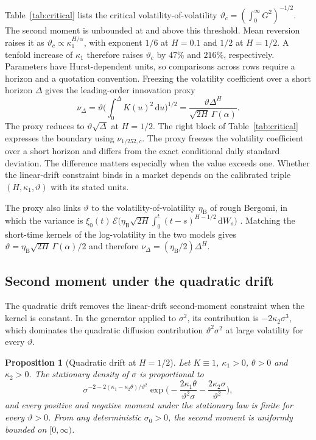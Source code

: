 \documentclass{rQUF2e}
\theoremstyle{plain}
\newtheorem{proposition}[theorem]{Proposition}
\theoremstyle{definition}
\theoremstyle{remark}
\newcommand{\D}{\mathrm{d}}
\begin{document}
Table~\ref{tab:critical} lists the critical volatility-of-volatility $\vartheta_c=(\int_0^\infty G^2)^{-1/2}$. The second moment is unbounded at and above this threshold. Mean reversion raises it as $\vartheta_c\propto\kappa_1^{H/\alpha}$, with exponent $1/6$ at $H=0.1$ and $1/2$ at $H=1/2$. A tenfold increase of $\kappa_1$ therefore raises $\vartheta_c$ by $47\%$ and $216\%$, respectively. Parameters have Hurst-dependent units, so comparisons across rows require a horizon and a quotation convention. Freezing the volatility coefficient over a short horizon $\Delta$ gives the leading-order innovation proxy
\begin{equation*}
\nu_\Delta=\vartheta\Big(\int_0^\Delta K(u)^2\,\D u\Big)^{1/2}
=\frac{\vartheta\Delta^H}{\sqrt{2H}\,\Gamma(\alpha)}.
\end{equation*}
The proxy reduces to $\vartheta\sqrt\Delta$ at $H=1/2$. The right block of Table~\ref{tab:critical} expresses the boundary using $\nu_{1/252,c}$. The proxy freezes the volatility coefficient over a short horizon and differs from the exact conditional daily standard deviation. The difference matters especially when the value exceeds one. Whether the linear-drift constraint binds in a market depends on the calibrated triple $(H,\kappa_1,\vartheta)$ with its stated units.

The proxy also links $\vartheta$ to the volatility-of-volatility $\eta_{\mathrm{B}}$ of rough Bergomi, in which the variance is $\xi_0(t)\,\mathcal{E}\big(\eta_{\mathrm{B}}\sqrt{2H}\int_0^t(t-s)^{H-1/2}\,\D W_s\big)$ \citep{BayerFrizGatheral2016}. Matching the short-time kernels of the log-volatility in the two models gives $\vartheta=\eta_{\mathrm{B}}\sqrt{2H}\,\Gamma(\alpha)/2$ and therefore $\nu_\Delta=(\eta_{\mathrm{B}}/2)\Delta^H$.

\subsection{Second moment under the quadratic drift}\label{sec:classical_qd}

The quadratic drift removes the linear-drift second-moment constraint when the kernel is constant. In the generator applied to $\sigma^2$, its contribution is $-2\kappa_2\sigma^3$, which dominates the quadratic diffusion contribution $\vartheta^2\sigma^2$ at large volatility for every $\vartheta$.

\begin{proposition}[Quadratic drift at $H=1/2$]\label{prop:classical_qd}
Let $K\equiv1$, $\kappa_1>0$, $\theta>0$ and $\kappa_2>0$. The stationary density of $\sigma$ is proportional to
\begin{equation}\label{eq:stationary_density}
\sigma^{-2-2(\kappa_1-\kappa_2\theta)/\vartheta^2}\exp\Big(-\frac{2\kappa_1\theta}{\vartheta^2\sigma}-\frac{2\kappa_2\sigma}{\vartheta^2}\Big),
\end{equation}
and every positive and negative moment under the stationary law is finite for every $\vartheta>0$. From any deterministic $\sigma_0>0$, the second moment is uniformly bounded on $[0,\infty)$.
\end{proposition}
\end{document}
